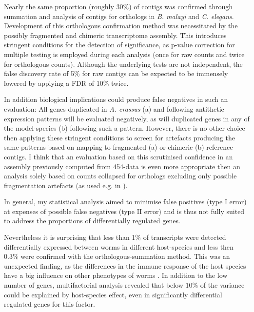 Nearly the same proportion (roughly 30\%) of contigs was confirmed
through summation and analysis of contigs for orthologs in
\textit{B. malayi} and \textit{C. elegans}. Development of this
orthologous confirmation method was necessitated by the possibly
fragmented and chimeric transcriptome assembly. This introduces
stringent conditions for the detection of significance, as p-value
correction for multiple testing is employed during each analysis (once
for raw counts and twice for orthologous counts). Although the
underlying tests are not independent, the false discovery rate of 5\%
for raw contigs can be expected to be immensely lowered by applying a
FDR of 10\% twice.

In addition biological implications could produce false negatives in
such an evaluation: All genes duplicated in \textit{A. crassus} (a)
and following antithetic expression patterns will be evaluated
negatively, as will duplicated genes in any of the model-species (b)
following such a pattern. However, there is no other choice then
applying these stringent conditions to screen for artefacts producing
the same patterns based on mapping to fragmented (a) or chimeric (b)
reference contigs. I think that an evaluation based on this
scrutinised confidence in an assembly previously computed from
454-data is even more appropriate then an analysis solely based on
counts collapsed for orthologs excluding only possible fragmentation
artefacts (as used e.g. in \cite{pmid22084086}).

In general, my statistical analysis aimed to minimise false positives
(type I error) at expenses of possible false negatives (type II error)
and is thus not fully suited to address the proportions of
differentially regulated genes.

Nevertheless it is surprising that less than 1\% of transcripts were
detected differentially expressed between worms in different
host-species and less then 0.3\% were confirmed with the
orthologous-summation method. This was an unexpected finding, as the
differences in the immune response of the host species have a big
influence on other phenotypes of worms
\cite{knopf_swimbladder_2006}. In addition to the low number of genes,
multifactorial analysis revealed that below 10\% of the variance could
be explained by host-species effect, even in significantly
differential regulated genes for this factor.

